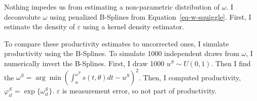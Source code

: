 \documentclass[
  12pt]{article}
\theoremstyle{definition}
\theoremstyle{remark}
\begin{document}
Nothing impedes us from estimating a non-parametric distribution of
\(\omega\). I deconvolute \(\omega\) using penalized B-Splines from
Equation~\ref{eq-w-squiggle}. First, I estimate the density of
\(\varepsilon\) using a kernel density estimator.

To compare these productivity estimates to uncorrected ones, I simulate
productivity using the B-Splines. To simulate 1000 independent draws
from \(\omega\), I numerically invert the B-Splines. First, I draw 1000
\(u^S\sim U(0,1)\). Then I find the
\(\omega^S = \arg \min \left(\int_a^{\omega^S} s(t,\theta)dt-u^S\right)^2\).
Then, I computed productivity, \(\varphi_{it}^S=\exp\{\omega_{it}^S\}\).
\(\varepsilon\) is measurement error, so not part of productivity.

\begin{table}

\caption{\label{tbl-np-prod}Non-Parametric Deconvolution of \(\omega\)
using Penalized B-Splines. The error density function is estimated using
a kernel density estimator fitted on the residuals of the first stage
conditional on firms being Non-Evaders.}


\end{table}%
\end{document}

